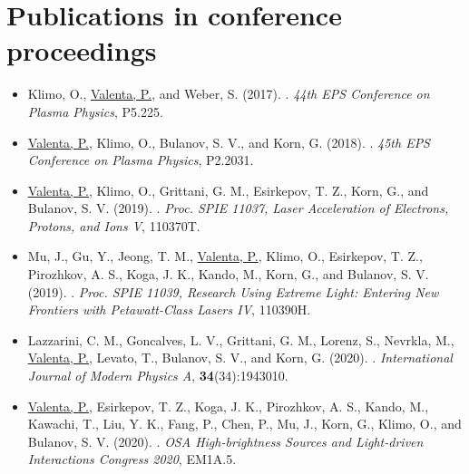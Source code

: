 \documentclass[10pt, twoside, a4paper, openright]{report}
\newcommand{\link}[3][blue]{\href{#2}{\color{#1}{#3}}}%
\begin{document}
\section{Publications in conference proceedings \label{sec:conference_proceedings}}

\begin{itemize}
	
	\item Klimo, O., \underline{Valenta, P.}, and Weber, S. (2017). \link{http://ocs.ciemat.es/EPS2017PAP/pdf/P5.225.pdf}{Laser absorption and ion acceleration under tight-focusing conditions}. \textit{44th EPS Conference on Plasma Physics}, P5.225.
	
	\item \underline{Valenta, P.}, Klimo, O., Bulanov, S. V., and Korn, G. (2018). \link{http://ocs.ciemat.es/EPS2018PAP/pdf/P2.2031.pdf}{On high-quality electron beam generated by breaking wake wave in near-critical density plasmas}. \textit{45th EPS Conference on Plasma Physics}, P2.2031. 
	
	\item \underline{Valenta, P.}, Klimo, O., Grittani, G. M., Esirkepov, T. Z., Korn, G., and Bulanov, S. V. (2019). \link{http://dx.doi.org/10.1117/12.2521040}{Wakefield excited by ultrashort laser pulses in near-critical density plasmas}. \textit{Proc. SPIE 11037, Laser Acceleration of Electrons, Protons, and Ions V}, 110370T.
	
	\item Mu, J., Gu, Y., Jeong, T. M., \underline{Valenta, P.}, Klimo, O., Esirkepov, T. Z., Pirozhkov, A. S., Koga, J. K., Kando, M., Korn, G., and Bulanov, S. V. (2019). \link{http://dx.doi.org/10.1117/12.2524653}{High order harmonics generation via laser reflection at electron density peaks}. \textit{Proc. SPIE 11039, Research Using Extreme Light: Entering New Frontiers with Petawatt-Class Lasers IV}, 110390H.
	
	\item Lazzarini, C. M., Goncalves, L. V., Grittani, G. M., Lorenz, S., Nevrkla, M., \underline{Valenta, P.}, Levato, T., Bulanov, S. V., and Korn, G. (2020). \link{http://dx.doi.org/10.1142/S0217751X19430103}{Electron acceleration at ELI Beamlines: towards high-energy and high-repetition-rate accelerators}. \textit{International Journal of Modern Physics A}, \textbf{34}(34):1943010.
	
	\item \underline{Valenta, P.}, Esirkepov, T. Z., Koga, J. K., Pirozhkov, A. S., Kando, M., Kawachi, T., Liu, Y. K., Fang, P., Chen, P., Mu, J., Korn, G., Klimo, O., and Bulanov, S. V. (2020). \link{http://dx.doi.org/10.1364/EUVXRAY.2020.EM1A.5}{Relativistic flying mirrors as a compact source of coherent short-wavelength radiation}. \textit{OSA High-brightness Sources and Light-driven Interactions Congress 2020}, EM1A.5.
	

\end{itemize}
\end{document}
